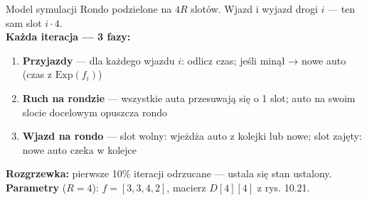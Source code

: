 \documentclass[aspectratio=169]{beamer}
\begin{document}
\begin{frame}{Model symulacji}
  Rondo podzielone na $4R$ slotów. Wjazd i wyjazd drogi $i$ — ten sam slot $i \cdot 4$.\\[0.6em]

  \textbf{Każda iteracja — 3 fazy:}
  \begin{enumerate}
    \item \textbf{Przyjazdy} — dla każdego wjazdu $i$: odlicz czas; jeśli minął → nowe auto (czas z $\mathrm{Exp}(f_i)$)
    \item \textbf{Ruch na rondzie} — wszystkie auta przesuwają się o 1 slot; auto na swoim slocie docelowym opuszcza rondo
    \item \textbf{Wjazd na rondo} — slot wolny: wjeżdża auto z kolejki lub nowe; slot zajęty: nowe auto czeka w kolejce
  \end{enumerate}

  \bigskip
  \textbf{Rozgrzewka:} pierwsze 10\% iteracji odrzucane — ustala się stan ustalony.\\[0.3em]
  \textbf{Parametry} ($R=4$): $f = [3, 3, 4, 2]$, macierz $D[4][4]$ z rys. 10.21.
\end{frame}
\end{document}
